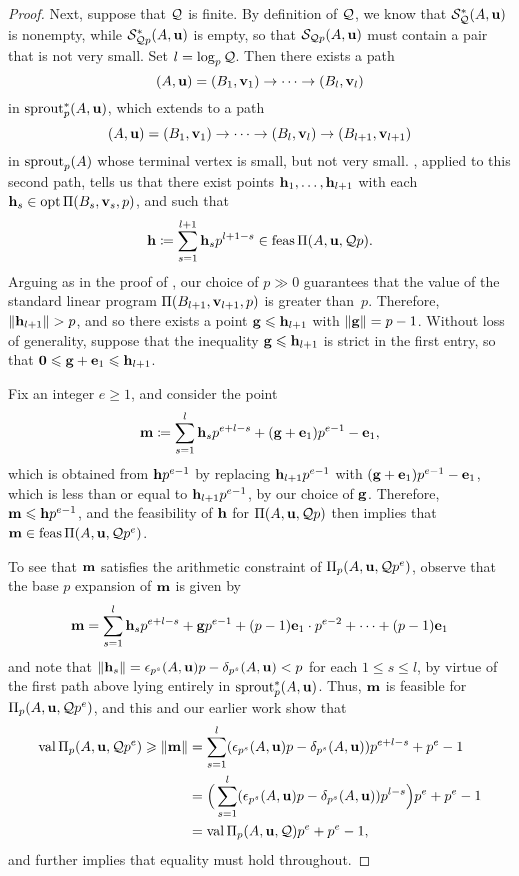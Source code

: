 \documentclass[11pt]{amsart}
\renewcommand{\S}{\mathcal{S}}
\begin{document}
\begin{proof}
   Next, suppose that $\mathcal{Q}$ is finite.
   By definition of $\mathcal{Q}$, we know that $\S_{\Q}^{\ast}(A,\vv{u})$ is nonempty, while $\S^{\ast}_{\Q p}(A,\vv{u})$ is empty, so that $\S_{\Q p}(A,\vv{u})$ must contain a pair that is not very small.
   Set $l=\log_p \mathcal{Q}$.
   Then there exists a path
   \[
      (A,\mathbf{u}) = (B_1,\mathbf{v}_1) \to \cdots \to (B_{l}, \mathbf{v}_{l})
   \]
   in $\operatorname{sprout}_p^{\ast}(A,\mathbf{u})$, which extends to a path
   \[
      (A,\mathbf{u}) = (B_1,\mathbf{v}_1) \to \cdots \to (B_{l}, \mathbf{v}_{l}) \to (B_{l+1}, \mathbf{v}_{l+1})
   \]
   in $\operatorname{sprout}_p(A)$ whose terminal vertex is small, but not very small.
   , applied to this second path, tells us that there exist points $\mathbf{h}_1,\ldots, \mathbf{h}_{l+1}$ with each $\mathbf{h}_s \in \operatorname{opt} \Pi(B_s, \mathbf{v}_s, p)$, and such that
   \[
      \mathbf{h} \coloneqq \sum_{s=1}^{l+1} \mathbf{h}_s p^{l+1-s} \in \operatorname{feas} \Pi(A,\mathbf{u}, \mathcal{Q} p).
   \]
   Arguing as in the proof of , our choice of $p \gg 0$ guarantees that the value of the standard linear program $\Pi(B_{l+1}, \mathbf{v}_{l+1},p)$ is greater than~$p$.
   Therefore, $\| \mathbf{h}_{l+1} \| > p$, and so there exists a point $\mathbf{g} \leqslant \mathbf{h}_{l+1}$ with $\| \mathbf{g} \| = p-1$.
   Without loss of generality, suppose that the inequality $\mathbf{g} \leqslant \mathbf{h}_{l+1}$ is strict in the first entry, so that $\mathbf{0} \leqslant \mathbf{g} + \mathbf{e}_1 \leqslant \mathbf{h}_{l+1}$.

   Fix an integer $e \geq 1$, and consider the point
   \[
      \mathbf{m} \coloneqq \sum_{s=1}^{l} \mathbf{h}_s p^{e+l-s} + (\mathbf{g}+\mathbf{e}_1)p^{e-1} - \mathbf{e}_1,
   \]
   which is obtained from $\mathbf{h}p^{e-1}$ by replacing $\mathbf{h}_{l+1}p^{e-1}$ with  $(\mathbf{g}+\mathbf{e}_1)p^{e-1} - \mathbf{e}_1$, which is less than or equal to $\mathbf{h}_{l+1} p^{e-1}$, by our choice of $\mathbf{g}$.
   Therefore, $\mathbf{m} \leqslant \mathbf{h}p^{e-1}$, and the feasibility of $\mathbf{h}$ for $\Pi(A,\mathbf{u}, \mathcal{Q} p)$ then implies that $\mathbf{m} \in \operatorname{feas} \Pi(A,\mathbf{u}, \mathcal{Q} p^e)$.

   To see that $\mathbf{m}$ satisfies the arithmetic constraint of $\Pi_p(A,\mathbf{u}, \mathcal{Q} p^e)$, observe that the base $p$ expansion of $\mathbf{m}$ is given by
   \[
      \mathbf{m} = \sum_{s=1}^{l} \mathbf{h}_s p^{e+l-s} + \mathbf{g}p^{e-1} + (p-1) \mathbf{e}_1 \cdot p^{e-2} + \cdots + (p-1)\mathbf{e}_1
   \]
   and note that $\| \mathbf{h}_s \| = \epsilon_{p^s}(A,\mathbf{u})p-\delta_{p^s}(A,\mathbf{u}) < p$ for each $1 \leq s \leq l$, by virtue of the first path above lying entirely in $\operatorname{sprout}_p^{\ast}(A,\mathbf{u})$.
   Thus, $\mathbf{m}$ is feasible for $\Pi_p(A,\mathbf{u}, \mathcal{Q} p^e)$, and this and our earlier work show that
   \begin{align*}
     \operatorname{val} \Pi_p(A,\mathbf{u}, \mathcal{Q} p^e) \geqslant \| \mathbf{m} \| & = \sum_{s=1}^l (\epsilon_{p^s}(A,\mathbf{u})p-\delta_{p^s}(A,\mathbf{u})) p^{e+l-s} + p^e-1 \\
                                                     & = \Big ( \sum_{s=1}^l (\epsilon_{p^s}(A,\mathbf{u})p-\delta_{p^s}(A,\mathbf{u})) p^{l-s} \Big ) p^e + p^e-1 \\
                                                     & = \operatorname{val} \Pi_p(A,\mathbf{u}, \mathcal{Q}) p^e + p^e-1,
   \end{align*}
   and  further implies that equality must hold throughout.


\end{proof}
\end{document}
